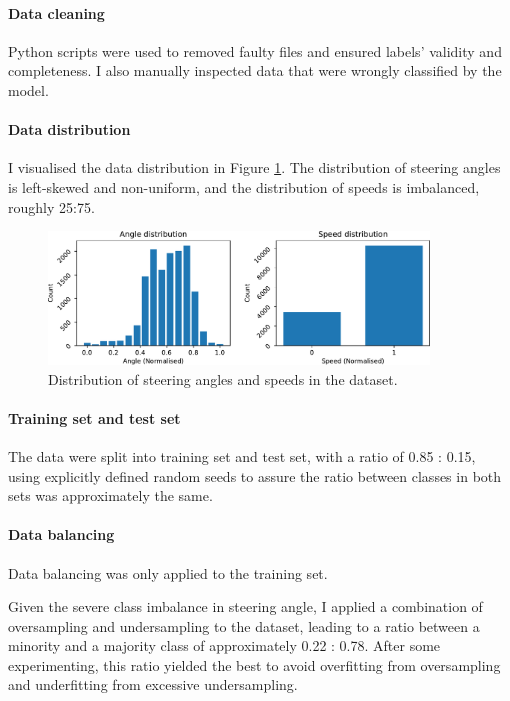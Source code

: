 \documentclass{article}
\begin{document}
\paragraph{Data cleaning}
Python scripts were used to removed faulty files and ensured labels' validity and completeness. I also manually inspected data that were wrongly classified by the model.

\paragraph{Data distribution}
I visualised the data distribution in Figure \ref{fig:angle_speed_distribution}. The distribution of steering angles is left-skewed and non-uniform, and the distribution of speeds is imbalanced, roughly 25:75.

\begin{figure}[h]
  \centering
  \includegraphics[width=0.9\textwidth]{figures/angle_speed_distribution.pdf}
  \caption{Distribution of steering angles and speeds in the dataset.}
  \label{fig:angle_speed_distribution}
\end{figure}

\paragraph{Training set and test set}
\label{sec:train_test_split}
The data were split into training set and test set, with a ratio of 0.85 : 0.15, using explicitly defined random seeds to assure the ratio between classes in both sets was approximately the same.

\paragraph{Data balancing}
Data balancing was only applied to the training set.

Given the severe class imbalance in steering angle, I applied a combination of oversampling and undersampling to the dataset, leading to a ratio between a minority and a majority class of approximately 0.22 : 0.78. After some experimenting, this ratio yielded the best to avoid overfitting from oversampling and underfitting from excessive undersampling.
\end{document}
